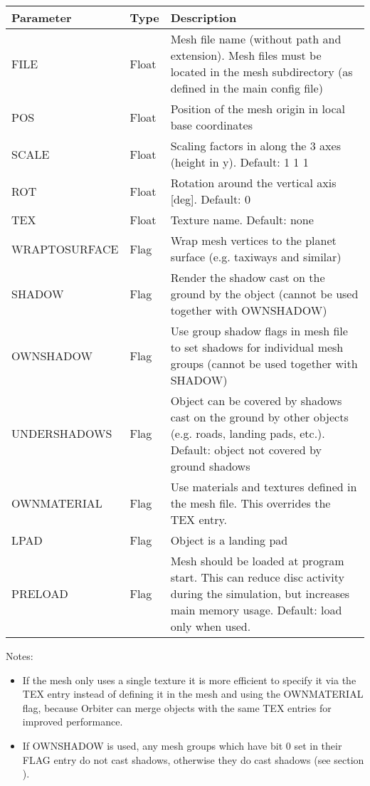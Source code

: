 \documentclass[Orbiter Developer Manual.tex]{subfiles}
\begin{document}
	\begin{longtable}{ |p{}|p{}|p{}| }
	\hline\rule{0pt}{2ex}
	\textbf{Parameter} & \textbf{Type} & \textbf{Description}\\
	\hline\rule{0pt}{2ex}
	FILE & Float & Mesh file name (without path and extension). Mesh files must be located in the mesh subdirectory (as defined in the main config file)\\
	\hline\rule{0pt}{2ex}
	POS & Float & Position of the mesh origin in local base coordinates\\
	\hline\rule{0pt}{2ex}
	SCALE & Float & Scaling factors in along the 3 axes (height in y). Default: 1 1 1\\
	\hline\rule{0pt}{2ex}
	ROT & Float & Rotation around the vertical axis [deg]. Default: 0\\
	\hline\rule{0pt}{2ex}
	TEX & Float & Texture name. Default: none\\
	\hline\rule{0pt}{2ex}
	WRAPTOSURFACE & Flag & Wrap mesh vertices to the planet surface (e.g. taxiways and similar)\\
	\hline\rule{0pt}{2ex}
	SHADOW & Flag & Render the shadow cast on the ground by the object (cannot be used together with OWNSHADOW)\\
	\hline\rule{0pt}{2ex}
	OWNSHADOW & Flag & Use group shadow flags in mesh file to set shadows for individual mesh groups (cannot be used together with SHADOW)\\
	\hline\rule{0pt}{2ex}
	UNDERSHADOWS & Flag & Object can be covered by shadows cast on the ground by other objects (e.g. roads, landing pads, etc.). Default: object not covered by ground shadows\\
	\hline\rule{0pt}{2ex}
	OWNMATERIAL & Flag & Use materials and textures defined in the mesh file. This overrides the TEX entry.\\
	\hline\rule{0pt}{2ex}
	LPAD & Flag & Object is a landing pad\\
	\hline\rule{0pt}{2ex}
	PRELOAD & Flag & Mesh should be loaded at program start. This can reduce disc activity during the simulation, but increases main memory usage. Default: load only when used.\\
	\hline
	\end{longtable}

\noindent
Notes:

\begin{itemize}
\item If the mesh only uses a single texture it is more efficient to specify it via the TEX entry instead of defining it in the mesh and using the OWNMATERIAL flag, because Orbiter can merge objects with the same TEX entries for improved performance.
\item If OWNSHADOW is used, any mesh groups which have bit 0 set in their FLAG entry do not cast shadows, otherwise they do cast shadows (see section \label{sec:mesh_file}).
\end{itemize}
\end{document}
